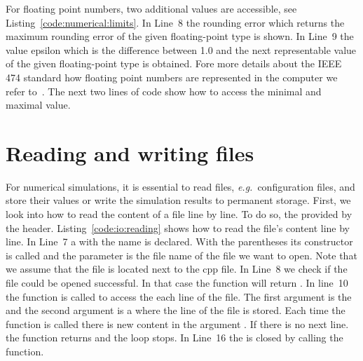 For floating point numbers, two additional values are accessible, see Listing~\ref{code:numerical:limits}. In Line~8 the rounding error  which returns the maximum rounding error of
the given floating-point type is shown. In Line~9 the value epsilon  which is the difference between 1.0 and the next representable value of the given floating-point type is obtained. Fore more details about the IEEE 474 standard how floating point numbers are represented in the computer we refer to~\cite{4610935,goldberg1991every}. The next two lines of code show how to access the minimal and maximal value.





\section{Reading and writing files}
For numerical simulations, it is essential to read files, \emph{e.g.}\ configuration files, and store their values or write the simulation results to permanent storage. First, we look into how to read the content of a file line by line. To do so, the  provided by the  header. Listing~\ref{code:io:reading} shows how to read the file's content  line by line. In Line~7 a  with the name  is declared. With the parentheses its constructor is called and the parameter is the file name of the file we want to open. Note that we assume that the file is located next to the cpp file. In Line~8 we check if the file could be opened successful. In that case the function  will return . In line~10 the function  is called to access the each line of the file. The first argument is the  and the second argument is a  where the line of the file is stored. Each time the function is called there is new content in the argument . If there is no next line. the function returns  and the  loop stops. In Line~16 the  is closed by calling the  function.\\

